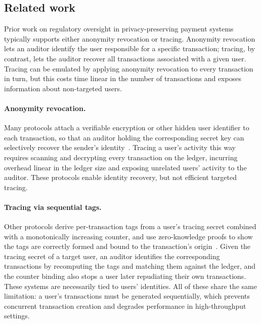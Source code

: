 \subsection{Related work}\label{sec:txid-related}

Prior work on regulatory oversight in privacy-preserving payment systems
typically supports either anonymity revocation or tracing.  Anonymity
revocation lets an auditor identify the user responsible for a specific
transaction; tracing, by contrast, lets the auditor recover all transactions
associated with a given user. Tracing can be emulated by applying anonymity
revocation to every transaction in turn, but this costs time linear in the
number of transactions and exposes information about non-targeted users.

\paragraph{Anonymity revocation.} Many protocols attach a verifiable encryption
or other hidden user identifier to each transaction, so that an auditor holding
the corresponding secret key can selectively recover the sender's
identity~\cite{SCN:CamHohLys06,CANS:BDET21,INDOCRYPT:CDLP22}.  Tracing a user's
activity this way requires scanning and decrypting every transaction on the
ledger, incurring overhead linear in the ledger size and exposing unrelated
users' activity to the auditor. These protocols enable identity recovery, but
not efficient targeted tracing.

\paragraph{Tracing via sequential tags.} Other protocols derive per-transaction
tags from a user's tracing secret combined with a monotonically increasing
counter, and use zero-knowledge proofs to show the tags are correctly formed
and bound to the transaction's origin~\cite{CCS:KiaKohSar22,CANS:SarKiaKoh24}.
Given the tracing secret of a target user, an auditor identifies the
corresponding transactions by recomputing the tags and matching them against
the ledger, and the counter binding also stops a user later repudiating their
own transactions. These systems are necessarily tied to users' identities.  All
of these share the same limitation: a user's transactions must be generated
sequentially, which prevents concurrent transaction creation and degrades
performance in high-throughput settings.

